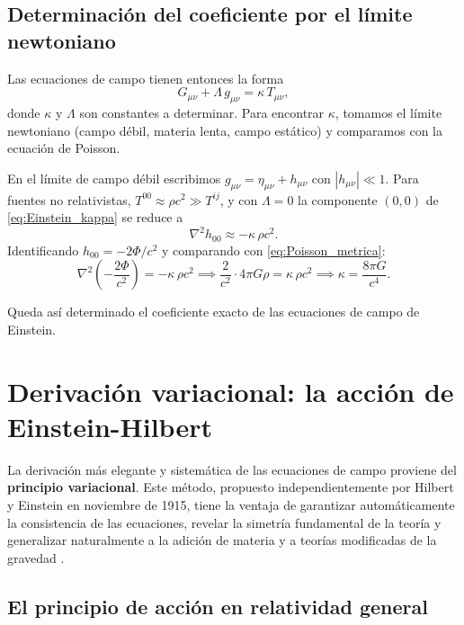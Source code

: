 \subsection{Determinación del coeficiente por el límite newtoniano}

Las ecuaciones de campo tienen entonces la forma
\begin{equation}
  G_{\mu\nu} + \Lambda\,g_{\mu\nu} = \kappa\,T_{\mu\nu},
  \label{eq:Einstein_kappa}
\end{equation}
donde $\kappa$ y $\Lambda$ son constantes a determinar. Para encontrar $\kappa$, tomamos el límite newtoniano (campo débil, materia lenta, campo estático) y comparamos con la ecuación de Poisson.

En el límite de campo débil escribimos $g_{\mu\nu} = \eta_{\mu\nu} + h_{\mu\nu}$ con $|h_{\mu\nu}|\ll 1$. Para fuentes no relativistas, $T^{00} \approx \rho c^2 \gg T^{ij}$, y con $\Lambda = 0$ la componente $(0,0)$ de \eqref{eq:Einstein_kappa} se reduce a
\begin{equation}
  \nabla^2 h_{00} \approx -\kappa\,\rho c^2.
\end{equation}
Identificando $h_{00} = -2\Phi/c^2$ y comparando con \eqref{eq:Poisson_metrica}:
\begin{equation}
  \nabla^2\left(-\frac{2\Phi}{c^2}\right) = -\kappa\,\rho c^2
  \implies
  \frac{2}{c^2}\cdot 4\pi G\rho = \kappa\,\rho c^2
  \implies
  \kappa = \frac{8\pi G}{c^4}.
\end{equation}

Queda así determinado el coeficiente exacto de las ecuaciones de campo de Einstein.

\section{Derivación variacional: la acción de Einstein-Hilbert}
\label{sec:accion_EH}

La derivación más elegante y sistemática de las ecuaciones de campo proviene del \textbf{principio variacional}. Este método, propuesto independientemente por Hilbert y Einstein en noviembre de 1915, tiene la ventaja de garantizar automáticamente la consistencia de las ecuaciones, revelar la simetría fundamental de la teoría y generalizar naturalmente a la adición de materia y a teorías modificadas de la gravedad \cite{Misner1973, Wald1984}.

\subsection{El principio de acción en relatividad general}

